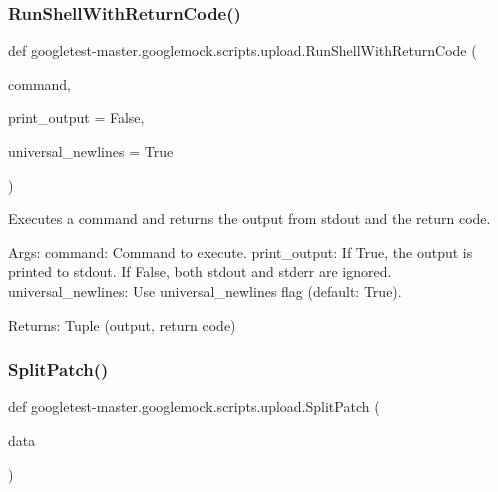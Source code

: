 \mbox{\label{namespacegoogletest-master_1_1googlemock_1_1scripts_1_1upload_a581e2d89c0a877b77e948253bf5329f3}} 
\subsubsection{\texorpdfstring{RunShellWithReturnCode()}{RunShellWithReturnCode()}}
{\footnotesize\ttfamily def googletest-\/master.\+googlemock.\+scripts.\+upload.\+Run\+Shell\+With\+Return\+Code (\begin{DoxyParamCaption}\item[{}]{command,  }\item[{}]{print\+\_\+output = {\ttfamily False},  }\item[{}]{universal\+\_\+newlines = {\ttfamily True} }\end{DoxyParamCaption})}

\begin{DoxyVerb}Executes a command and returns the output from stdout and the return code.

Args:
  command: Command to execute.
  print_output: If True, the output is printed to stdout.
                If False, both stdout and stderr are ignored.
  universal_newlines: Use universal_newlines flag (default: True).

Returns:
  Tuple (output, return code)
\end{DoxyVerb}
 \mbox{\label{namespacegoogletest-master_1_1googlemock_1_1scripts_1_1upload_aa51c64118998af0d17151d5ff6f40a50}} 
\subsubsection{\texorpdfstring{SplitPatch()}{SplitPatch()}}
{\footnotesize\ttfamily def googletest-\/master.\+googlemock.\+scripts.\+upload.\+Split\+Patch (\begin{DoxyParamCaption}\item[{}]{data }\end{DoxyParamCaption})}

